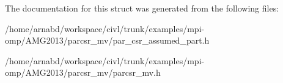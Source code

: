 The documentation for this struct was generated from the following files\+:\begin{DoxyCompactItemize}
\item 
/home/arnabd/workspace/civl/trunk/examples/mpi-\/omp/\+A\+M\+G2013/parcsr\+\_\+mv/par\+\_\+csr\+\_\+assumed\+\_\+part.\+h\item 
/home/arnabd/workspace/civl/trunk/examples/mpi-\/omp/\+A\+M\+G2013/parcsr\+\_\+mv/parcsr\+\_\+mv.\+h\end{DoxyCompactItemize}
